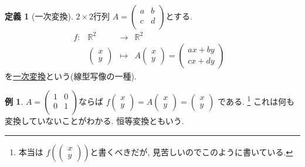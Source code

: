\documentclass[dvipdfmx,a4paper,11pt]{article}
\newcommand{\R}{\mathbb{R}}
\theoremstyle{definition}
\newtheorem{dfn}[thm]{定義}
\newtheorem{exa}[thm]{例}
\begin{document}
\begin{tcolorbox}[
    colback = white,
    colframe = green!35!black,
    fonttitle = \bfseries,
    breakable = true]
    \begin{dfn}[一次変換]
    $2 \times 2$行列
$
A=\begin{pmatrix}
a& b \\
c& d \\
\end{pmatrix}
$とする. 
 $$
\begin{array}{ccccc}
f: &\R^2& \rightarrow & \R^2& \\
&\begin{pmatrix}
x \\ y
 \end{pmatrix} & \longmapsto & 
A
\begin{pmatrix}
x \\ y
 \end{pmatrix}  = 
 \begin{pmatrix}
ax + by \\ cx + dy
 \end{pmatrix}
 &
\end{array}
$$
を\underline{一次変換}という(線型写像の一種).
\end{dfn}
 \end{tcolorbox}
 
 
  \begin{exa}
$
A=\begin{pmatrix}
1& 0 \\
0& 1 \\
\end{pmatrix}
$ならば
$
f\begin{pmatrix}
x \\ y
 \end{pmatrix} 
 =
 A
\begin{pmatrix}
x \\ y
 \end{pmatrix}  = 
 \begin{pmatrix}
x \\y
 \end{pmatrix}
$
である. \footnote{本当は
$f\left(\begin{pmatrix}
x \\ y
 \end{pmatrix} \right)$と書くべきだが, 見苦しいのでこのように書いている.}
これは何も変換していないことがわかる. 恒等変換ともいう. 
\end{exa}
 
\end{document}
